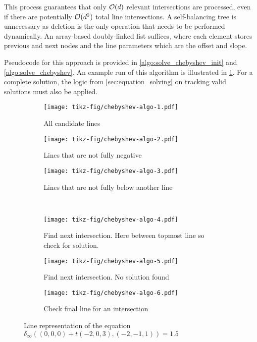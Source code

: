 This process guarantees that only \(\mathcal{O}(d)\) relevant intersections are processed, even if there are potentially \(\mathcal{O}(d^2)\) total line intersections. A self-balancing tree is unnecessary as deletion is the only operation that needs to be performed dynamically. An array-based doubly-linked list suffices, where each element stores previous and next nodes and the line parameters which are the offset and slope. 

Pseudocode for this approach is provided in \cref{algo:solve_chebyshev_init} and \cref{algo:solve_chebyshev}. An example run of this algorithm is illustrated in \cref{fig:chebyshev_algo}. For a complete solution, the logic from \cref{sec:equation_solving} on tracking valid solutions must also be applied.

\begin{figure}
  \centering 
  \begin{subfigure}[t]{0.3\textwidth}
		\texttt{[image: tikz-fig/chebyshev-algo-1.pdf]}
    \caption{All candidate lines}
  \end{subfigure}
  \begin{subfigure}[t]{0.3\textwidth}
    \texttt{[image: tikz-fig/chebyshev-algo-2.pdf]}
    \caption{Lines that are not fully negative}
  \end{subfigure}
  \begin{subfigure}[t]{0.3\textwidth}
    \texttt{[image: tikz-fig/chebyshev-algo-3.pdf]}
    \caption{Lines that are not fully below another line}
  \end{subfigure}\\
  \begin{subfigure}[t]{0.3\textwidth}
    \texttt{[image: tikz-fig/chebyshev-algo-4.pdf]}
    \caption{Find next intersection. Here between topmost line so check for solution.}
  \end{subfigure}
  \begin{subfigure}[t]{0.3\textwidth}
    \texttt{[image: tikz-fig/chebyshev-algo-5.pdf]}
    \caption{Find next intersection. No solution found}
  \end{subfigure}
  \begin{subfigure}[t]{0.3\textwidth}
    \texttt{[image: tikz-fig/chebyshev-algo-6.pdf]}
    \caption{Check final line for an intersection}
  \end{subfigure}
  \caption{Line representation of the equation \(\delta_\infty((0,0,0) + t(-2,0,3), (-2,-1,1)) = 1.5\)}
  \label{fig:chebyshev_algo}
\end{figure}

